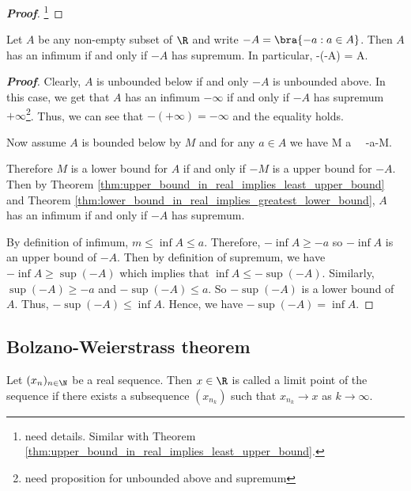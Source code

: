 \begin{proof}[\bf Proof]
\footnote{need details. Similar with Theorem \ref{thm:upper_bound_in_real_implies_least_upper_bound}.}%
\end{proof}


\begin{lemma}\label{lem:supreum_infimum_mirror_relation}%
Let $A$ be any non-empty subset of $\R$ and write $-A =\bra{-a:a\in A}$. Then $A$ has an infimum if and only if $-A$ has supremum. In particular,
\be
-\sup(-A) = \inf A.
\ee
\end{lemma}

\begin{proof}[\bf Proof]%
Clearly, $A$ is unbounded below if and only $-A$ is unbounded above. In this case, we get that $A$ has an infimum $-\infty$ if and only if $-A$ has supremum $+\infty$\footnote{need proposition for unbounded above and supremum}. Thus, we can see that $-(+\infty) = -\infty$ and the equality holds.

Now assume $A$ is bounded below by $M$ and for any $a\in A$ we have
\be
M \leq a \ \lra \ -a\leq -M.
\ee

Therefore $M$ is a lower bound for $A$ if and only if $-M$ is a upper bound for $-A$. Then by Theorem \ref{thm:upper_bound_in_real_implies_least_upper_bound} and Theorem \ref{thm:lower_bound_in_real_implies_greatest_lower_bound}, $A$ has an infimum if and only if $-A$ has supremum.

By definition of infimum, $m\leq \inf A \leq a$. Therefore, $-\inf A \geq -a$ so $-\inf A$ is an upper bound of $-A$. Then by definition of supremum, we have $-\inf A \geq \sup(-A)$ which implies that $\inf A \leq -\sup(-A)$. Similarly, $\sup(-A) \geq -a$ and $-\sup(-A) \leq a$. So $-\sup(-A)$ is a lower bound of $A$. Thus, $-\sup(-A) \leq \inf A$. Hence, we have $-\sup(-A) = \inf A$.
\end{proof}


\subsection{Bolzano-Weierstrass theorem}

\begin{definition}
Let $(x_n)_{n\in \N}$ be a real sequence. Then $x\in \R$ is called a limit point of the sequence if there exists a subsequence $(x_{n_k})$ such that $x_{n_k}\to x$ as $k\to \infty$.
\end{definition}

